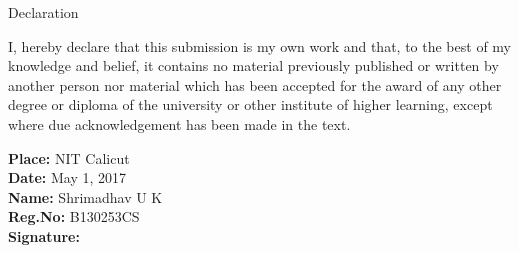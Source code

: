 \newpage
\thispagestyle{empty}

\begin{center}

\LARGE Declaration \\[2.5cm]
\end{center}
\normalsize I, hereby declare that this submission is my own work and that, to the best of my knowledge and belief, it contains no material previously published or written by another person nor material which has been accepted for the award of any other degree or diploma of the university or other institute of higher learning, except where due acknowledgement has been made in the text. \\[1.0cm]

\vfill



\begin{flushleft}
\textbf{Place: } NIT Calicut \\
\textbf{Date: } May 1, 2017 \\
\textbf{Name: } Shrimadhav U K \\
\textbf{Reg.No: } B130253CS \\[1.0cm]

\textbf{Signature: }
\end{flushleft}
